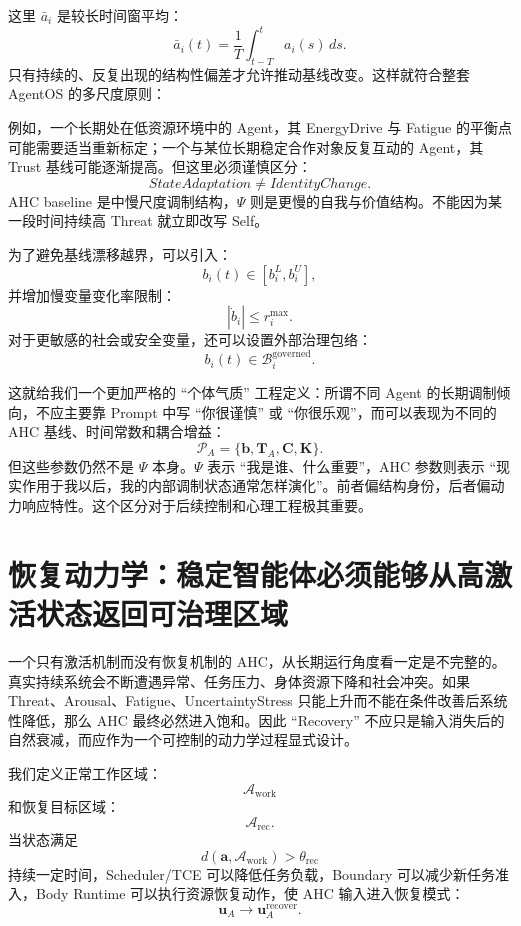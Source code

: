 这里 $\bar a_i$ 是较长时间窗平均：
\[
\bar a_i(t)
=
\frac{1}{T}
\int_{t-T}^{t}
a_i(s)\,ds.
\]
只有持续的、反复出现的结构性偏差才允许推动基线改变。这样就符合整套 AgentOS 的多尺度原则：
\begin{statementbox}
\centering
{}
\end{statementbox}

例如，一个长期处在低资源环境中的 Agent，其 EnergyDrive 与 Fatigue 的平衡点可能需要适当重新标定；一个与某位长期稳定合作对象反复互动的 Agent，其 Trust 基线可能逐渐提高。但这里必须谨慎区分：
\[
StateAdaptation
\neq
IdentityChange.
\]
AHC baseline 是中慢尺度调制结构，$\Psi$ 则是更慢的自我与价值结构。不能因为某一段时间持续高 Threat 就立即改写 Self。

为了避免基线漂移越界，可以引入：
\[
b_i(t)
\in
[b_i^{L},b_i^{U}],
\]
并增加慢变量变化率限制：
\[
|\dot b_i|
\le
r_i^{\max}.
\]
对于更敏感的社会或安全变量，还可以设置外部治理包络：
\[
b_i(t)
\in
\mathcal B_i^{\mathrm{governed}}.
\]

这就给我们一个更加严格的 ``个体气质'' 工程定义：所谓不同 Agent 的长期调制倾向，不应主要靠 Prompt 中写 ``你很谨慎'' 或 ``你很乐观''，而可以表现为不同的 AHC 基线、时间常数和耦合增益：
\[
\mathcal P_A
=
\{
\mathbf b,
\mathbf T_A,
\mathbf C,
\mathbf K
\}.
\]
但这些参数仍然不是 $\Psi$ 本身。$\Psi$ 表示 ``我是谁、什么重要''，AHC 参数则表示 ``现实作用于我以后，我的内部调制状态通常怎样演化''。前者偏结构身份，后者偏动力响应特性。这个区分对于后续控制和心理工程极其重要。


\section{恢复动力学：稳定智能体必须能够从高激活状态返回可治理区域}

一个只有激活机制而没有恢复机制的 AHC，从长期运行角度看一定是不完整的。真实持续系统会不断遭遇异常、任务压力、身体资源下降和社会冲突。如果 Threat、Arousal、Fatigue、UncertaintyStress 只能上升而不能在条件改善后系统性降低，那么 AHC 最终必然进入饱和。因此 ``Recovery'' 不应只是输入消失后的自然衰减，而应作为一个可控制的动力学过程显式设计。

我们定义正常工作区域：
\[
\mathcal A_{\mathrm{work}}
\]
和恢复目标区域：
\[
\mathcal A_{\mathrm{rec}}.
\]
当状态满足
\[
d(
\mathbf a,
\mathcal A_{\mathrm{work}}
)
>
\theta_{\mathrm{rec}}
\]
持续一定时间，Scheduler/TCE 可以降低任务负载，Boundary 可以减少新任务准入，Body Runtime 可以执行资源恢复动作，使 AHC 输入进入恢复模式：
\[
\mathbf u_A
\rightarrow
\mathbf u_A^{\mathrm{recover}}.
\]

